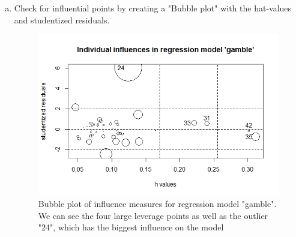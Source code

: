 \documentclass[12pt,letterpaper]{article}
\begin{document}
\begin{enumerate}[(a)]
    \vspace{1cm} 
	\item Check for influential points by creating a "Bubble plot" with the hat-values and studentized residuals.
		
	
	\begin{figure}\centering
	\label{bubble}
	\includegraphics[width=\textwidth]{Bubble.JPEG}
	\caption{Bubble plot of influence measures for regression model "gamble". We can see the four large leverage points as well as the outlier "24", which has the biggest influence on the model}
	\end{figure}	
\end{enumerate}
\end{document}
